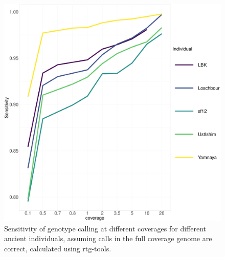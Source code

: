 {\begin{figure}[htp]
    \centering
    \includegraphics[width=1.0\textwidth]{../images/chapter1/allDownsampled_rtgtools_sensitivity.pdf}
    \caption{Sensitivity of genotype calling at different coverages for different ancient individuals, assuming calls in the full coverage genome are correct,  calculated using rtg-tools.}
    \label{fig:Sensitivity_downsampled_rtgtools}
\end{figure}

}
